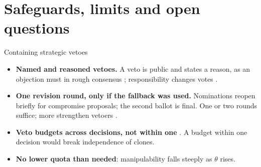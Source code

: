 \documentclass[10pt,aspectratio=169]{beamer}
\begin{document}
\section{Safeguards, limits and open questions}

\begin{frame}{Containing strategic vetoes}
  \begin{itemize}
    \item \textbf{Named and reasoned vetoes.} A veto is public and states a reason, as an objection must in
      rough consensus ; responsibility changes votes .
    \item \textbf{One revision round, only if the fallback was used.} Nominations reopen briefly for
      compromise proposals; the second ballot is final. One or two rounds suffice; more strengthen
      vetoers .
    \item \textbf{Veto budgets across decisions, not within one} . A
      budget within one decision would break independence of clones.
    \item \textbf{No lower quota than needed}: manipulability falls steeply as $\theta$ rises.
  \end{itemize}
  \medskip
\end{frame}
\end{document}
